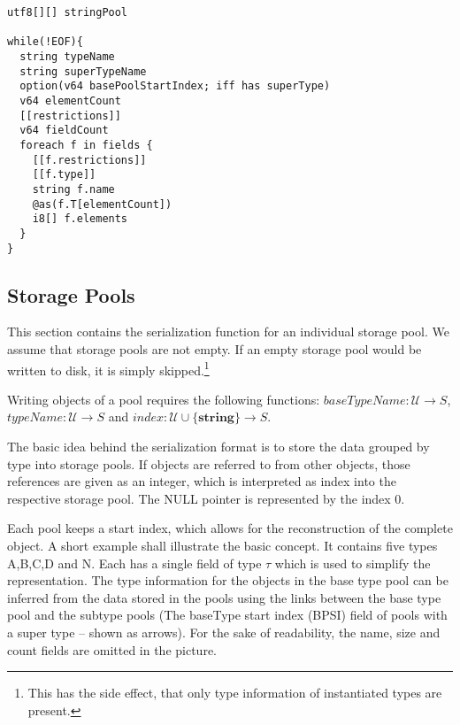 \begin{verbatim}
utf8[][] stringPool

while(!EOF){
  string typeName
  string superTypeName
  option(v64 basePoolStartIndex; iff has superType)
  v64 elementCount
  [[restrictions]]
  v64 fieldCount
  foreach f in fields {
    [[f.restrictions]]
    [[f.type]]
    string f.name
    @as(f.T[elementCount])
    i8[] f.elements
  }
}
\end{verbatim}


\subsection{Storage Pools}

This section contains the serialization function for an individual storage pool. We assume that storage pools are not empty. If an empty storage pool would be written to disk, it is simply skipped.\footnote{This has the side effect, that only type information of instantiated types are present.}

Writing objects of a pool requires the following functions: $baseTypeName: \mathcal{U} → S$, $typeName: \mathcal{U} → S$ and $index: \mathcal{U}\cup\{\textbf{string}\} → S$.

The basic idea behind the serialization format is to store the data grouped by type into storage pools. If objects are referred to from other objects, those references are given as an integer, which is interpreted as index into the respective storage pool. The NULL pointer is represented by the index 0.

Each pool keeps a start index, which allows for the reconstruction of the complete object. A short example shall illustrate the basic concept. It contains five types A,B,C,D and N. Each has a single field of type $\tau$ which is used to simplify the representation. The type information for the objects in the base type pool can be inferred from the data stored in the pools using the links between the base type pool and the subtype pools (The \gls{baseType} start index (BPSI) field of pools with a super type -- shown as arrows). For the sake of readability, the name, size and count fields are omitted in the picture.

